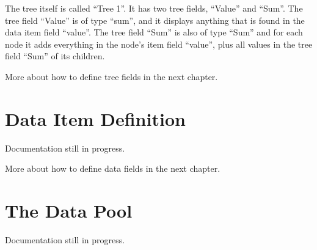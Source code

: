 \documentclass[letterpaper,10pt,english]{sphinxmanual}
\begin{document}
\begin{sphinxVerbatim}[commandchars=\\\{\}]
 
     
         
         \PYG{p}{[}\PYG{p}{]}
         \PYG{p}{[}\PYG{p}{]}
         \PYG{p}{[}\PYG{p}{]}
         \PYG{p}{[}\PYG{p}{]}
     
         
         \PYG{p}{[}\PYG{p}{]}
         \PYG{p}{[}\PYG{p}{]}
         \PYG{p}{[}\PYG{p}{]}
         \PYG{p}{[}\PYG{p}{]}
\end{sphinxVerbatim}

\sphinxAtStartPar
The tree itself is called “Tree 1”. It has two tree fields, “Value” and “Sum”. The tree field “Value” is of type “sum”, and it displays anything that is found in the data item field “value”. The tree field “Sum” is also of type “Sum” and for each node it adds everything in the node’s item field “value”, plus all values in the tree field “Sum” of its children.

\sphinxAtStartPar
More about how to define tree fields in the next chapter.


\section{Data Item Definition}
\label{\detokenize{data-format:data-item-definition}}
\sphinxAtStartPar
Documentation still in progress.

\sphinxAtStartPar
More about how to define data fields in the next chapter.


\section{The Data Pool}
\label{\detokenize{data-format:the-data-pool}}
\sphinxAtStartPar
Documentation still in progress.
\end{document}
